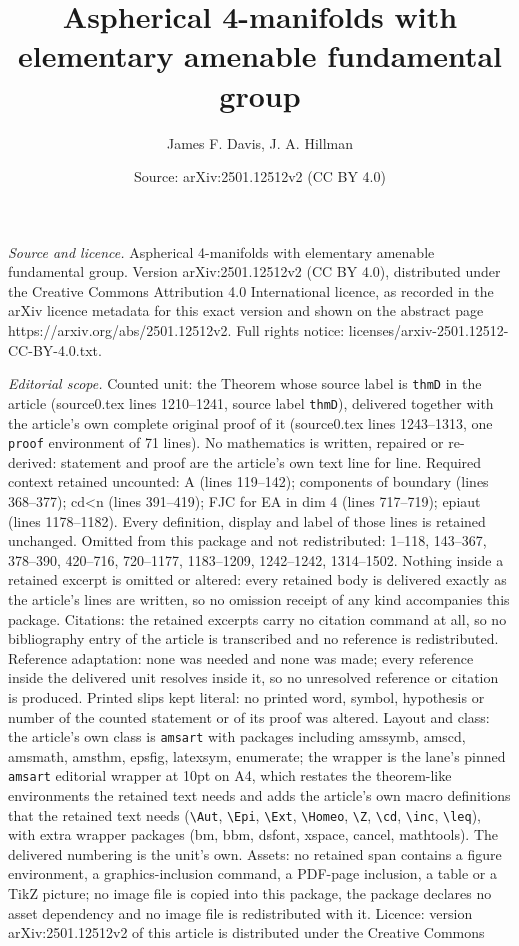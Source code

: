 \documentclass[10pt,a4paper]{amsart}
\title[Aspherical 4-manifolds with elementary amenable fundamental ]{Aspherical 4-manifolds with elementary amenable fundamental group}
\author{James F. Davis, J. A. Hillman}
\date{Source: arXiv:2501.12512v2 (CC BY 4.0)}
\begin{document}
\maketitle

\noindent\emph{Source and licence.} Aspherical 4-manifolds with elementary amenable fundamental group. Version arXiv:2501.12512v2 (CC BY 4.0), distributed under the Creative Commons Attribution 4.0 International licence, as recorded in the arXiv licence metadata for this exact version and shown on the abstract page https://arxiv.org/abs/2501.12512v2. Full rights notice: licenses/arxiv-2501.12512-CC-BY-4.0.txt.\par\smallskip

\noindent\textit{Editorial scope.} Counted unit: the Theorem whose source label is \texttt{thmD} in the article (source0.tex lines 1210--1241, source label \texttt{thmD}), delivered together with the article's own complete original proof of it (source0.tex lines 1243--1313, one \texttt{proof} environment of 71 lines). No mathematics is written, repaired or re-derived: statement and proof are the article's own text line for line. Required context retained uncounted: A (lines 119--142); components of boundary (lines 368--377); cd<n (lines 391--419); FJC for EA in dim 4 (lines 717--719); epiaut (lines 1178--1182). Every definition, display and label of those lines is retained unchanged. Omitted from this package and not redistributed: 1--118, 143--367, 378--390, 420--716, 720--1177, 1183--1209, 1242--1242, 1314--1502. Nothing inside a retained excerpt is omitted or altered: every retained body is delivered exactly as the article's lines are written, so no omission receipt of any kind accompanies this package. Citations: the retained excerpts carry no citation command at all, so no bibliography entry of the article is transcribed and no reference is redistributed. Reference adaptation: none was needed and none was made; every reference inside the delivered unit resolves inside it, so no unresolved reference or citation is produced. Printed slips kept literal: no printed word, symbol, hypothesis or number of the counted statement or of its proof was altered. Layout and class: the article's own class is \texttt{amsart} with packages including amssymb, amscd, amsmath, amsthm, epsfig, latexsym, enumerate; the wrapper is the lane's pinned \texttt{amsart} editorial wrapper at 10pt on A4, which restates the theorem-like environments the retained text needs and adds the article's own macro definitions that the retained text needs (\texttt{\textbackslash Aut}, \texttt{\textbackslash Epi}, \texttt{\textbackslash Ext}, \texttt{\textbackslash Homeo}, \texttt{\textbackslash Z}, \texttt{\textbackslash cd}, \texttt{\textbackslash inc}, \texttt{\textbackslash leq}), with extra wrapper packages (bm, bbm, dsfont, xspace, cancel, mathtools). The delivered numbering is the unit's own. Assets: no retained span contains a figure environment, a graphics-inclusion command, a PDF-page inclusion, a table or a TikZ picture; no image file is copied into this package, the package declares no asset dependency and no image file is redistributed with it. Licence: version arXiv:2501.12512v2 of this article is distributed under the Creative Commons 
\end{document}
